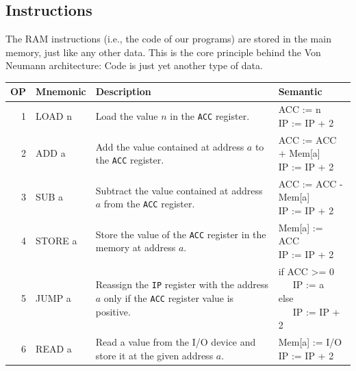 \documentclass {aldast}
\begin{document}
\subsection{Instructions}

The RAM instructions (i.e., the code of our programs) are stored in
the main memory, just like any other data. This is the core principle
behind the Von Neumann architecture: Code is just yet another type of
data.

\begin{table}[htbp]
  \begin{center}
    \begin{tabular}{r>{\ttfamily}lp{4cm}>{\ttfamily}p{3.5cm}}
      \toprule
      OP & Mnemonic & Description                                                                                                 & Semantic                          \\
      \midrule
      1  & LOAD n   & Load the value $n$ in the \texttt{ACC} register.                                                            & \makecell[tl]{ACC := n            \\IP := IP + 2 } \\[1cm]
      2  & ADD a    & Add the value contained at address $a$ to the \texttt{ACC} register.                                        & \makecell[tl]{ACC := ACC + Mem[a] \\ IP := IP + 2} \\[1cm]
      3  & SUB a    & Subtract the value contained at address $a$ from the \texttt{ACC} register.                                 & \makecell[tl]{ACC := ACC - Mem[a] \\ IP := IP + 2} \\[1cm]
      4  & STORE a  & Store the value of the \texttt{ACC} register in the memory at address $a$.                                  & \makecell[tl]{Mem[a] := ACC       \\ IP := IP + 2} \\[1cm]
      5  & JUMP a   & Reassign the \texttt{IP} register with the address $a$ only if the \texttt{ACC} register value is positive. & \makecell[tl]{if ACC >= 0         \\ ~~~IP := a \\ else \\ ~~~IP := IP + 2} \\[1.5cm]
      6  & READ a   & Read a value from the I/O device and store it at the given address $a$.                                     & \makecell[tl]{Mem[a] := I/O       \\ IP := IP + 2} \\[1cm]

\end{tabular}
\end{center}
\end{table}
\end{document}
